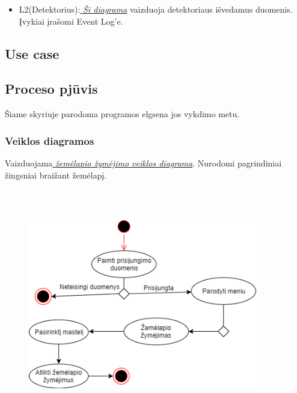 \documentclass[oneside]{VUMIFPSkursinis}
\begin{document}
\begin{itemize}
		\item L2(Detektorius):\hyperref[fig:l2det]{\textit{ Ši diagrama}} vaizduoja detektoriaus išvedamus duomenis. Įvykiai įrašomi Event Log’e.
\end{itemize}
\pagebreak
		


\subsection{Use case}
\subsection{Proceso pjūvis}
	Šiame skyriuje parodoma programos elgsena jos vykdimo metu.
\subsubsection{Veiklos diagramos}
	Vaizduojama\hyperref[fig:ActivityMapŽimėjimas]{\textit{ žemėlapio žymėjimo veiklos diagrama}}. Nurodomi pagrindiniai žingsniai braižant žemėlapį.
	\vskip 0.5cm
	\begin{figure}[H]
	\centering	
	\includegraphics[width=10cm,height=10cm,keepaspectratio]{ActivityMapŽimėjimas.png}
	\caption{}
	\label{fig:ActivityMapŽimėjimas}
\end{figure}

	
\end{document}
